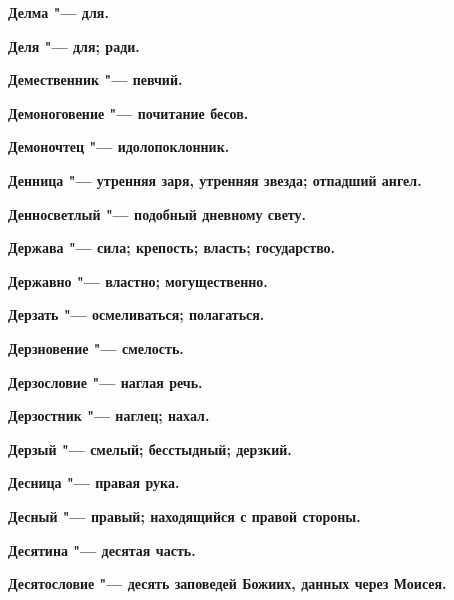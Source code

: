 \begin{mymulticols}{2}
\bfseries Делма\normalfont{} "--- для. 




\bfseries Деля\normalfont{} "--- для; ради. 




\bfseries Демественник\normalfont{} "--- певчий. 




\bfseries Демоноговение\normalfont{} "--- почитание бесов. 




\bfseries Демоночтец\normalfont{} "--- идолопоклонник. 




\bfseries Денница\normalfont{} "--- утренняя заря, утренняя звезда; отпадший ангел. 




\bfseries Денносветлый\normalfont{} "--- подобный дневному свету. 




\bfseries Держава\normalfont{} "--- сила; крепость; власть; государство. 




\bfseries Державно\normalfont{} "--- властно; могущественно. 




\bfseries Дерзать\normalfont{} "--- осмеливаться; полагаться. 




\bfseries Дерзновение\normalfont{} "--- смелость. 




\bfseries Дерзословие\normalfont{} "--- наглая речь. 




\bfseries Дерзостник\normalfont{} "--- наглец; нахал. 




\bfseries Дерзый\normalfont{} "--- смелый; бесстыдный; дерзкий. 




\bfseries Десница\normalfont{} "--- правая рука. 




\bfseries Десный\normalfont{} "--- правый; находящийся с правой стороны. 




\bfseries Десятина\normalfont{} "--- десятая часть. 




\bfseries Десятословие\normalfont{} "--- десять заповедей Божиих, данных через Моисея. 





\end{mymulticols}
